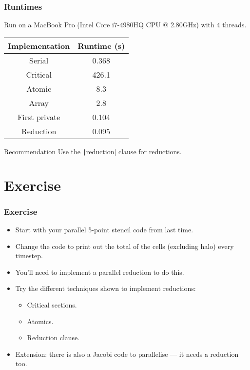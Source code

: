 \documentclass{beamer}
\begin{document}
\begin{frame}
\frametitle{Runtimes}
Run on a MacBook Pro (Intel Core i7-4980HQ CPU @ 2.80GHz) with 4 threads.

\vfill

\begin{table}
\begin{tabular}{cc}
\toprule
Implementation & Runtime (s) \\
\midrule
Serial        & 0.368 \\
Critical      & 426.1 \\
Atomic        & 8.3 \\
Array         & 2.8 \\
First private & 0.104 \\
Reduction     & 0.095 \\
\bottomrule
\end{tabular}
\end{table}

\begin{block}{Recommendation}
Use the \texttt|reduction| clause for reductions.
\end{block}

\end{frame}

\section{Exercise}
\begin{frame}
\frametitle{Exercise}
\begin{itemize}
  \item Start with your parallel 5-point stencil code from last time.
  \item Change the code to print out the total of the cells (excluding halo) every timestep.
  \item You'll need to implement a parallel reduction to do this.
  \item Try the different techniques shown to implement reductions:
    \begin{itemize}
      \item Critical sections.
      \item Atomics.
      \item Reduction clause.
    \end{itemize}
  \item Extension: there is also a Jacobi code to parallelise --- it needs a reduction too.
\end{itemize}
\end{frame}
\end{document}
